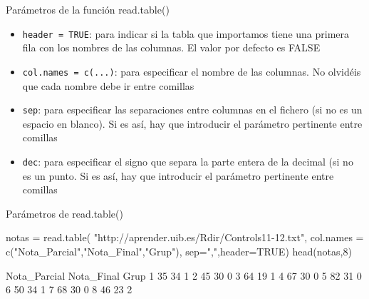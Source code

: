 \documentclass[
  ignorenonframetext,
  aspectratio=169]{beamer}
\newenvironment{Shaded}{\begin{snugshade}}{\end{snugshade}}
\newcommand{\AttributeTok}[1]{\textcolor[rgb]{0.77,0.63,0.00}{#1}}
\newcommand{\ConstantTok}[1]{\textcolor[rgb]{0.00,0.00,0.00}{#1}}
\newcommand{\DecValTok}[1]{\textcolor[rgb]{0.00,0.00,0.81}{#1}}
\newcommand{\FunctionTok}[1]{\textcolor[rgb]{0.00,0.00,0.00}{#1}}
\newcommand{\NormalTok}[1]{#1}
\newcommand{\OtherTok}[1]{\textcolor[rgb]{0.56,0.35,0.01}{#1}}
\newcommand{\StringTok}[1]{\textcolor[rgb]{0.31,0.60,0.02}{#1}}
\providecommand{\tightlist}{%
  \setlength{\itemsep}{0pt}\setlength{\parskip}{0pt}}
\let\oldverbatim\verbatim
\let\endoldverbatim\endverbatim
\renewenvironment{verbatim}{\tiny\oldverbatim}{\endoldverbatim}
\begin{document}
\begin{frame}[fragile]{Parámetros de la función read.table()}
\protect\hypertarget{paruxe1metros-de-la-funciuxf3n-read.table}{}
\begin{itemize}
\tightlist
\item
  \texttt{header\ =\ TRUE}: para indicar si la tabla que importamos
  tiene una primera fila con los nombres de las columnas. El valor por
  defecto es FALSE
\item
  \texttt{col.names\ =\ c(...)}: para especificar el nombre de las
  columnas. No olvidéis que cada nombre debe ir entre comillas
\item
  \texttt{sep}: para especificar las separaciones entre columnas en el
  fichero (si no es un espacio en blanco). Si es así, hay que introducir
  el parámetro pertinente entre comillas
\item
  \texttt{dec}: para especificar el signo que separa la parte entera de
  la decimal (si no es un punto. Si es así, hay que introducir el
  parámetro pertinente entre comillas
\end{itemize}
\end{frame}

\begin{frame}[fragile]{Parámetros de read.table()}
\protect\hypertarget{paruxe1metros-de-read.table}{}
\begin{Shaded}
\begin{Highlighting}[]
\NormalTok{notas }\OtherTok{=} \FunctionTok{read.table}\NormalTok{(}
  \StringTok{"http://aprender.uib.es/Rdir/Controls11{-}12.txt"}\NormalTok{, }
  \AttributeTok{col.names =} \FunctionTok{c}\NormalTok{(}\StringTok{"Nota\_Parcial"}\NormalTok{,}\StringTok{"Nota\_Final"}\NormalTok{,}\StringTok{"Grup"}\NormalTok{),}
  \AttributeTok{sep=}\StringTok{","}\NormalTok{,}\AttributeTok{header=}\ConstantTok{TRUE}\NormalTok{)}
\FunctionTok{head}\NormalTok{(notas,}\DecValTok{8}\NormalTok{)}
\end{Highlighting}
\end{Shaded}

\begin{verbatim}
  Nota_Parcial Nota_Final Grup
1           35         34    1
2           45         30    0
3           64         19    1
4           67         30    0
5           82         31    0
6           50         34    1
7           68         30    0
8           46         23    2
\end{verbatim}
\end{frame}
\end{document}
